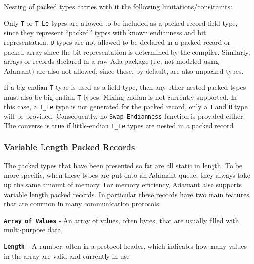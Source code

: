 Nesting of packed types carries with it the following limitations/constraints:

\vspace{5mm} %
\begin{spacedenumerate}
  \item Only \texttt{T} or \texttt{T\_Le} types are allowed to be included as a packed record field type, since they represent ``packed'' types with known endianness and bit representation. \texttt{U} types are not allowed to be declared in a packed record or packed array since the bit representation is determined by the compiler. Similarly, arrays or records declared in a raw Ada package (i.e. not modeled using Adamant) are also not allowed, since these, by default, are also unpacked types.
  \item If a big-endian \texttt{T} type is used as a field type, then any other nested packed types must also be big-endian \texttt{T} types. Mixing endian is not currently supported. In this case, a \texttt{T\_Le} type is not generated for the packed record, only a \texttt{T} and \texttt{U} type will be provided. Consequently, no \texttt{Swap\_Endianness} function is provided either. The converse is true if little-endian \texttt{T\_Le} types are nested in a packed record.
\end{spacedenumerate}
\vspace{5mm} %

\subsubsection{Variable Length Packed Records} \label{Variable Length Packed Records}

The packed types that have been presented so far are all static in length. To be more specific, when these types are put onto an Adamant queue, they always take up the same amount of memory. For memory efficiency, Adamant also supports variable length packed records. In particular these records have two main features that are common in many communication protocols:

\vspace{5mm} %
\begin{spaceditemize}
  \item \textbf{\texttt{Array of Values}} - An array of values, often bytes, that are usually filled with multi-purpose data
  \item \textbf{\texttt{Length}} - A number, often in a protocol header, which indicates how many values in the array are valid and currently in use
\end{spaceditemize}
\vspace{5mm} %

